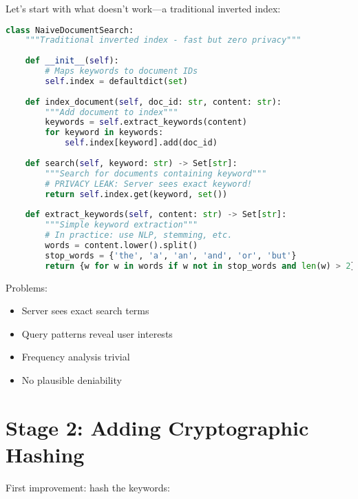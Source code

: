 Let's start with what doesn't work—a traditional inverted index:

\begin{lstlisting}[language=Python, caption={Naive approach - NO PRIVACY}]
class NaiveDocumentSearch:
    """Traditional inverted index - fast but zero privacy"""
    
    def __init__(self):
        # Maps keywords to document IDs
        self.index = defaultdict(set)
    
    def index_document(self, doc_id: str, content: str):
        """Add document to index"""
        keywords = self.extract_keywords(content)
        for keyword in keywords:
            self.index[keyword].add(doc_id)
    
    def search(self, keyword: str) -> Set[str]:
        """Search for documents containing keyword"""
        # PRIVACY LEAK: Server sees exact keyword!
        return self.index.get(keyword, set())
    
    def extract_keywords(self, content: str) -> Set[str]:
        """Simple keyword extraction"""
        # In practice: use NLP, stemming, etc.
        words = content.lower().split()
        stop_words = {'the', 'a', 'an', 'and', 'or', 'but'}
        return {w for w in words if w not in stop_words and len(w) > 2}
\end{lstlisting}

Problems:
\begin{itemize}
\item Server sees exact search terms
\item Query patterns reveal user interests
\item Frequency analysis trivial
\item No plausible deniability
\end{itemize}

\section{Stage 2: Adding Cryptographic Hashing}

First improvement: hash the keywords:

